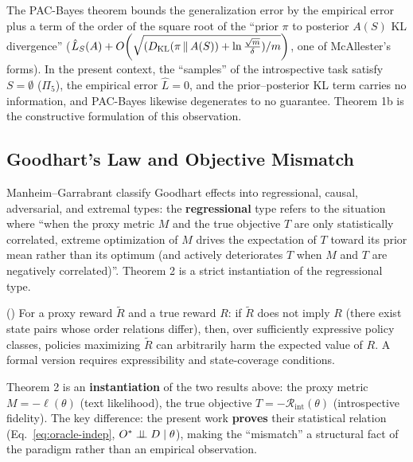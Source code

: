 \begin{remark}
The PAC-Bayes theorem\cite{mcallester-1999} bounds the generalization error by the empirical
error plus a term of the order of the square root of the ``prior $\pi$ to posterior $A(S)$ KL
divergence''
($\hat{L}_S(A) + O\!\left(\sqrt{(D_{\mathrm{KL}}\!\left(\pi\,\|\,A(S)\right) + \ln \tfrac{\sqrt{m}}{\delta})/m}\right)$,
one of McAllester's forms). In the present context, the ``samples'' of the
introspective task satisfy $S = \emptyset$ ($\Pi_5$), the empirical error $\hat{L} = 0$, and
the prior--posterior KL term carries no information, and PAC-Bayes likewise degenerates to no
guarantee. Theorem 1b is the constructive formulation of this observation.
\end{remark}

\subsection{Goodhart's Law and Objective Mismatch}

\begin{remark}\label{thm:goodhart-tax}
Manheim--Garrabrant\cite{manheim-garrabrant-2018-goodhart} classify Goodhart effects into
regressional, causal, adversarial, and extremal types: the \textbf{regressional} type refers
to the situation where ``when the proxy metric $M$ and the true objective $T$ are only
statistically correlated, extreme optimization of $M$ drives the expectation of $T$ toward
its prior mean rather than its optimum (and actively deteriorates $T$ when $M$ and $T$ are
negatively correlated)''. Theorem 2 is a strict instantiation of the
regressional type.
\end{remark}

\begin{restate}
(\cite{skalse-2022-reward-hacking}) For a proxy reward $\widetilde{R}$ and a true reward
$R$: if $\widetilde{R}$ does not imply $R$ (there exist state pairs whose order relations
differ), then, over sufficiently expressive policy classes, policies maximizing
$\widetilde{R}$ can arbitrarily harm the expected value of $R$. A formal version requires
expressibility and state-coverage conditions.
\end{restate}

\begin{remark}
Theorem 2 is an \textbf{instantiation} of the two results above: the proxy metric
$M = -\ell(\theta)$ (text likelihood), the true objective $T = -\mathcal{R}_{\mathrm{int}}(\theta)$
(introspective fidelity). The key difference: the present work \textbf{proves} their statistical
relation (Eq.~\eqref{eq:oracle-indep}, $O^{*} \perp\!\!\!\perp D \mid \theta$), making the ``mismatch''
a structural fact of the paradigm rather than an empirical observation.
\end{remark}

